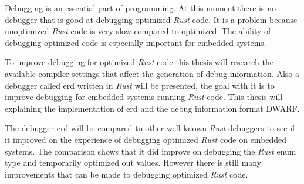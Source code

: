 Debugging is an essential part of programming.
At this moment there is no debugger that is good at debugging optimized \emph{Rust} code.
It is a problem because unoptimized \emph{Rust} code is very slow compared to optimized.
The ability of debugging optimized code is especially important for embedded systems.


To improve debugging for optimized \emph{Rust} code this thesis will research the available compiler settings that affect the generation of debug information.
Also a debugger called \acrshort{erd} written in \emph{Rust} will be presented, the goal with it is to improve debugging for embedded systems running \emph{Rust} code.
This thesis will explaining the implementation of \acrshort{erd} and the debug information format \acrshort{DWARF}.


The debugger \acrshort{erd} will be compared to other well known \emph{Rust} debuggers to see if it improved on the experience of debugging optimized \emph{Rust} code on embedded systems.
The comparison shows that it did improve on debugging the \emph{Rust} enum type and temporarily optimized out values.
However there is still many improvements that can be made to debugging optimized \emph{Rust} code.

